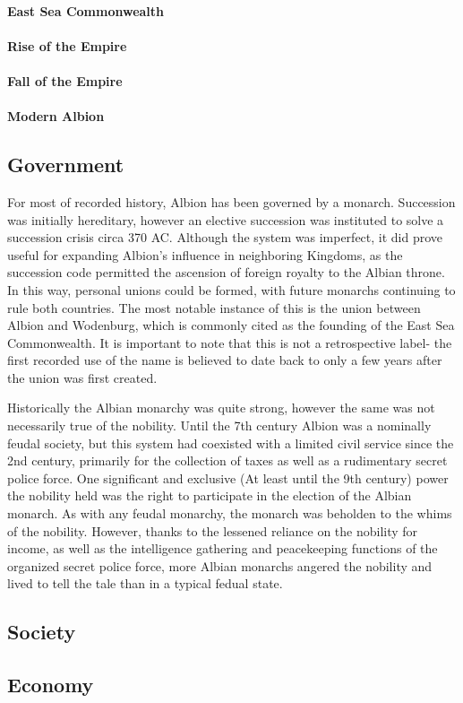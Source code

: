 	\paragraph{East Sea Commonwealth}

	\paragraph{Rise of the Empire}

	\paragraph{Fall of the Empire}

	\paragraph{Modern Albion}


\subsection{Government} 
	
	For most of recorded history, Albion has been governed by a monarch.  Succession was initially hereditary, however an elective succession was instituted to solve a succession crisis circa 370 AC.  Although the system was imperfect, it did prove useful for expanding Albion's influence in neighboring Kingdoms, as the succession code permitted the ascension of foreign royalty to the Albian throne.  In this way, personal unions could be formed, with future monarchs continuing to rule both countries.  The most notable instance of this is the union between Albion and Wodenburg, which is commonly cited as the founding of the East Sea Commonwealth.  It is important to note that this is not a retrospective label- the first recorded use of the name is believed to date back to only a few years after the union was first created.
	
	Historically the Albian monarchy was quite strong, however the same was not necessarily true of the nobility.  Until the 7th century Albion was a nominally feudal society, but this system had  coexisted with a limited civil service since the 2nd century, primarily for the collection of taxes as well as a rudimentary secret police force.  One significant and exclusive (At least until the 9th century) power the nobility held was the right to participate in the election of the Albian monarch.  As with any feudal monarchy, the monarch was beholden to the whims of the nobility.  However, thanks to the lessened reliance on the nobility for income, as well as the intelligence gathering and peacekeeping functions of the organized secret police force, more Albian monarchs angered the nobility and lived to tell the tale than in a typical fedual state.

\subsection{Society}

\subsection{Economy}